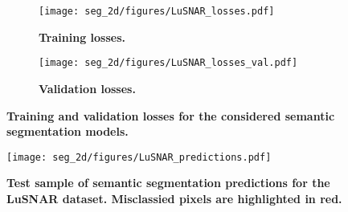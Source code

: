 \begin{figure}[t]
	\centering
	\begin{subfigure}[b]{\linewidth}
		\texttt{[image: seg\_2d/figures/LuSNAR\_losses.pdf]}
		\caption{\bfseries Training losses.}
		\label{fig:lusnar_losses}
	\end{subfigure}
	\begin{subfigure}[b]{\linewidth}
		\texttt{[image: seg\_2d/figures/LuSNAR\_losses\_val.pdf]}
		\caption{\bfseries Validation losses.}
		\label{fig:lusnar_val_losses}
	\end{subfigure}
	\caption{\bfseries Training and validation losses for the considered semantic segmentation models.}
\end{figure}
\begin{figure}[h!]
	\centering
	\texttt{[image: seg\_2d/figures/LuSNAR\_predictions.pdf]}
	\caption{\bfseries Test sample of semantic segmentation predictions for the LuSNAR dataset. Misclassied pixels are highlighted in red.}
	\label{fig:lusnar_predictions}
\end{figure}

